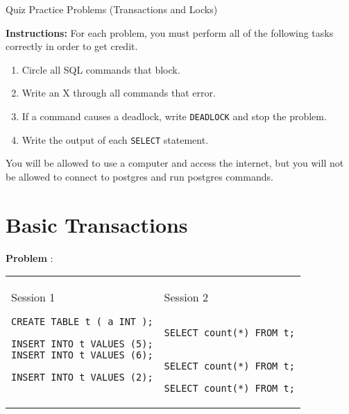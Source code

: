 \documentclass[10pt]{article}
\theoremstyle{definition}
\newtheorem{note}{Note}
\newcounter{ProblemCounter}
\newcommand{\nextproblem}{\filbreak\stepcounter{ProblemCounter} \noindent\textbf{Problem \theProblemCounter}:}
\begin{document}
\begin{center}
{
\Large
    Quiz Practice Problems (Transactions and Locks)
}

    \vspace{0.1in}
\end{center}

\noindent
\textbf{Instructions:}
For each problem, you must perform all of the following tasks correctly in order to get credit.
\begin{enumerate}
\item Circle all SQL commands that block.
\item Write an X through all commands that error.
\item If a command causes a deadlock, write \lstinline{DEADLOCK} and stop the problem.
\item Write the output of each \lstinline{SELECT} statement.
\end{enumerate}
    You will be allowed to use a computer and access the internet, but you will not be allowed to connect to postgres and run postgres commands.

\section{Basic Transactions}

\nextproblem
\begin{tcolorbox}
\begin{tabular}{p{3.25in}p{3in}}
\hspace{-0.2in}Session 1
\begin{lstlisting}
CREATE TABLE t ( a INT );

INSERT INTO t VALUES (5);
INSERT INTO t VALUES (6);

INSERT INTO t VALUES (2);
  
\end{lstlisting}
    &
\hspace{-0.2in}Session 2
\begin{lstlisting}

SELECT count(*) FROM t;


SELECT count(*) FROM t;

SELECT count(*) FROM t;
\end{lstlisting}
\end{tabular}
\vspace{-0.2in}
\end{tcolorbox}
\vspace{0.25in}
\end{document}
